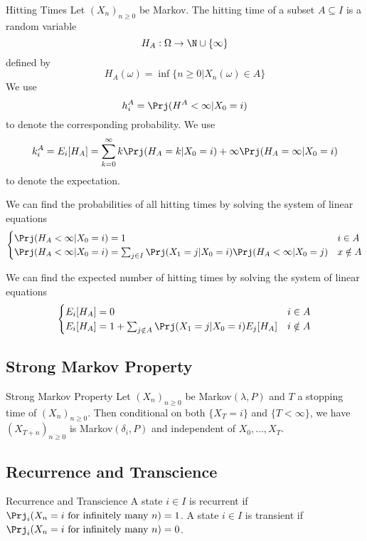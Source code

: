 \documentclass[a4paper]{article}
\begin{document}
\begin{defn}{Hitting Times}{} Let $(X_n)_{n\geq 0}$ be Markov. The hitting time of a subset $A\subseteq I$ is a random variable $$H_A:\Omega\to\N\cup\{\infty\}$$ defined by $$H_A(\omega)=\inf\{n\geq 0|X_n(\omega)\in A\}$$ We use $$h_i^A=\Prj(H^A<\infty|X_0=i)$$ to denote the corresponding probability. We use $$k_i^A=E_i[H_A]=\sum_{k=0}^\infty k\Prj(H_A=k|X_0=i)+\infty\Prj(H_A=\infty|X_0=i)$$ to denote the expectation. 
\end{defn}

\begin{prp}{}{} We can find the probabilities of all hitting times by solving the system of linear equations $$\begin{cases}
\Prj(H_A<\infty|X_0=i)=1 & i\in A\\
\Prj(H_A<\infty|X_0=i)=\sum_{j\in I}\Prj(X_1=j|X_0=i)\Prj(H_A<\infty|X_0=j) & x\notin A
\end{cases}$$
\end{prp}

\begin{prp}{}{} We can find the expected number of hitting times by solving the system of linear equations $$\begin{cases}
E_i[H_A]=0 & i\in A\\
E_i[H_A]=1+\sum_{j\notin A}\Prj(X_1=j|X_0=i)E_j[H_A] & i\notin A
\end{cases}$$
\end{prp}

\subsection{Strong Markov Property}
\begin{thm}{Strong Markov Property}{} Let $(X_n)_{n\geq 0}$ be Markov$(\lambda,P)$ and $T$ a stopping time of $(X_n)_{n\geq 0}$. Then conditional on both $\{X_T=i\}$ and $\{T<\infty\}$, we have $(X_{T+n})_{n\geq 0}$ is Markov$(\delta_i,P)$ and independent of $X_0,\dots,X_T$. 
\end{thm}

\subsection{Recurrence and Transcience}
\begin{defn}{Recurrence and Transcience}{} A state $i\in I$ is recurrent if $\Prj_i(X_n=i\text{ for infinitely many }n)=1$. A state $i\in I$ is transient if $\Prj_i(X_n=i\text{ for infinitely many }n)=0$. 
\end{defn}
\end{document}
